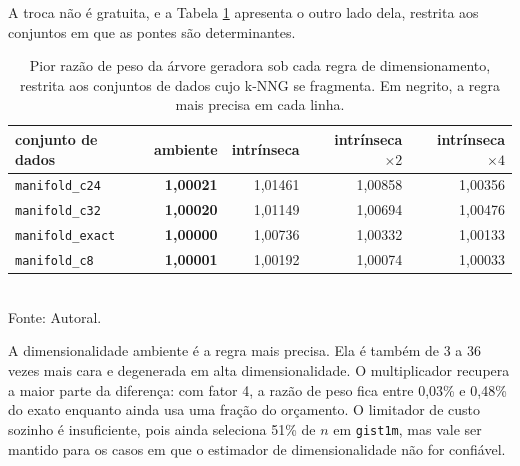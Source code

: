 A troca não é gratuita, e a Tabela \ref{tab:budget-quality} apresenta o outro lado dela, restrita aos conjuntos em que as pontes são determinantes.\\

\begin{table}[htb!]
\caption{\label{tab:budget-quality} Pior razão de peso da árvore geradora sob cada regra de dimensionamento, restrita aos conjuntos de dados cujo \ac{k-NNG} se fragmenta. Em negrito, a regra mais precisa em cada linha.}
\centering
\footnotesize
\begin{tabular}{@{}lrrrr@{}}
\toprule
conjunto de dados & ambiente & intrínseca & intrínseca $\times 2$ & intrínseca $\times 4$ \\
\midrule
\texttt{manifold\_c24}   & \textbf{1,00021} & 1,01461 & 1,00858 & 1,00356 \\
\texttt{manifold\_c32}   & \textbf{1,00020} & 1,01149 & 1,00694 & 1,00476 \\
\texttt{manifold\_exact} & \textbf{1,00000} & 1,00736 & 1,00332 & 1,00133 \\
\texttt{manifold\_c8}    & \textbf{1,00001} & 1,00192 & 1,00074 & 1,00033 \\
\bottomrule
\end{tabular}\\
Fonte: Autoral.
\end{table}

A dimensionalidade ambiente é a regra mais precisa. Ela é também de 3 a 36 vezes mais cara e degenerada em alta dimensionalidade. O multiplicador recupera a maior parte da diferença: com fator 4, a razão de peso fica entre 0,03\% e 0,48\% do exato enquanto ainda usa uma fração do orçamento. O limitador de custo sozinho é insuficiente, pois ainda seleciona 51\% de $n$ em \texttt{gist1m}, mas vale ser mantido para os casos em que o estimador de dimensionalidade não for confiável.\\


